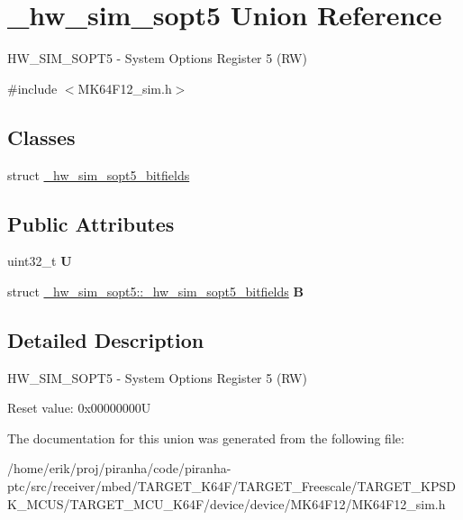 \hypertarget{union__hw__sim__sopt5}{}\section{\+\_\+hw\+\_\+sim\+\_\+sopt5 Union Reference}
\label{union__hw__sim__sopt5}


H\+W\+\_\+\+S\+I\+M\+\_\+\+S\+O\+P\+T5 -\/ System Options Register 5 (RW)  




{\ttfamily \#include $<$M\+K64\+F12\+\_\+sim.\+h$>$}

\subsection*{Classes}
\begin{DoxyCompactItemize}
\item 
struct \hyperlink{struct__hw__sim__sopt5_1_1__hw__sim__sopt5__bitfields}{\+\_\+hw\+\_\+sim\+\_\+sopt5\+\_\+bitfields}
\end{DoxyCompactItemize}
\subsection*{Public Attributes}
\begin{DoxyCompactItemize}
\item 
uint32\+\_\+t {\bfseries U}\hypertarget{union__hw__sim__sopt5_aaef47ac6f55b0616364d328cb6a2a67f}{}\label{union__hw__sim__sopt5_aaef47ac6f55b0616364d328cb6a2a67f}

\item 
struct \hyperlink{struct__hw__sim__sopt5_1_1__hw__sim__sopt5__bitfields}{\+\_\+hw\+\_\+sim\+\_\+sopt5\+::\+\_\+hw\+\_\+sim\+\_\+sopt5\+\_\+bitfields} {\bfseries B}\hypertarget{union__hw__sim__sopt5_a7e6f75bed4c68a44ec1a54266468a32f}{}\label{union__hw__sim__sopt5_a7e6f75bed4c68a44ec1a54266468a32f}

\end{DoxyCompactItemize}


\subsection{Detailed Description}
H\+W\+\_\+\+S\+I\+M\+\_\+\+S\+O\+P\+T5 -\/ System Options Register 5 (RW) 

Reset value\+: 0x00000000U 

The documentation for this union was generated from the following file\+:\begin{DoxyCompactItemize}
\item 
/home/erik/proj/piranha/code/piranha-\/ptc/src/receiver/mbed/\+T\+A\+R\+G\+E\+T\+\_\+\+K64\+F/\+T\+A\+R\+G\+E\+T\+\_\+\+Freescale/\+T\+A\+R\+G\+E\+T\+\_\+\+K\+P\+S\+D\+K\+\_\+\+M\+C\+U\+S/\+T\+A\+R\+G\+E\+T\+\_\+\+M\+C\+U\+\_\+\+K64\+F/device/device/\+M\+K64\+F12/M\+K64\+F12\+\_\+sim.\+h\end{DoxyCompactItemize}
